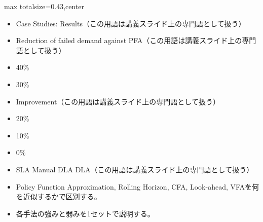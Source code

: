 \clearpage
{}
\begin{minipage}[t]{0.405\textwidth}
\begin{adjustbox}{max totalsize={\textwidth}{0.43\textheight},center}
\begin{minipage}{\textwidth}\scriptsize
{}\begin{itemize}
\item Case Studies: Results（この用語は講義スライド上の専門語として扱う）
\item Reduction of failed demand against PFA（この用語は講義スライド上の専門語として扱う）
\item 40\%
\item 30\%
\item Improvement（この用語は講義スライド上の専門語として扱う）
\item 20\%
\item 10\%
\item 0\%
\item SLA Manual DLA DLA（この用語は講義スライド上の専門語として扱う）
\end{itemize}\begin{itemize}
\item Policy Function Approximation, Rolling Horizon, CFA, Look-ahead, VFAを何を近似するかで区別する。
\item 各手法の強みと弱みを1セットで説明する。
\end{itemize}
\end{minipage}
\end{adjustbox}
\end{minipage}\hfill
